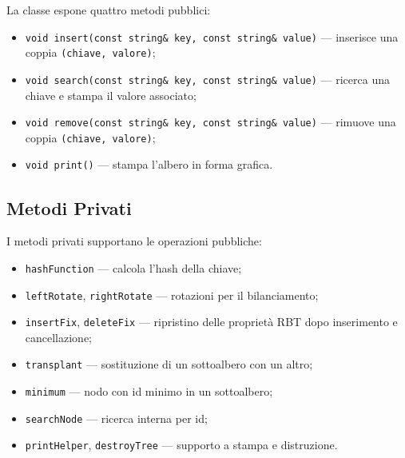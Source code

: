 La classe espone quattro metodi pubblici:

\begin{itemize}
    \item \texttt{void insert(const string\& key, const string\& value)} --- 
    inserisce una coppia \texttt{(chiave, valore)};
    \item \texttt{void search(const string\& key, const string\& value)} --- 
    ricerca una chiave e stampa il valore associato;
    \item \texttt{void remove(const string\& key, const string\& value)} --- 
    rimuove una coppia \texttt{(chiave, valore)};
    \item \texttt{void print()} --- stampa l'albero in forma grafica.
\end{itemize}

\subsection{Metodi Privati}

I metodi privati supportano le operazioni pubbliche:

\begin{itemize}
    \item \texttt{hashFunction} --- calcola l'hash della chiave;
    \item \texttt{leftRotate}, \texttt{rightRotate} --- rotazioni per il 
    bilanciamento;
    \item \texttt{insertFix}, \texttt{deleteFix} --- ripristino delle proprietà 
    RBT dopo inserimento e cancellazione;
    \item \texttt{transplant} --- sostituzione di un sottoalbero con un altro;
    \item \texttt{minimum} --- nodo con id minimo in un sottoalbero;
    \item \texttt{searchNode} --- ricerca interna per id;
    \item \texttt{printHelper}, \texttt{destroyTree} --- supporto a stampa e 
    distruzione.
\end{itemize}